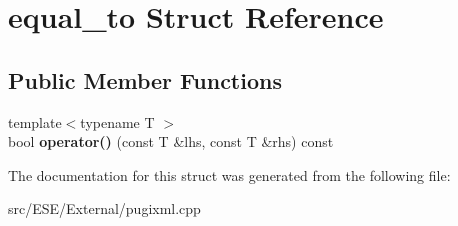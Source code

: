 \hypertarget{structequal__to}{\section{equal\-\_\-to Struct Reference}
\label{structequal__to}
}
\subsection*{Public Member Functions}
\begin{DoxyCompactItemize}
\item 
\hypertarget{structequal__to_acaf39da83a307280fef2f11691386b0e}{{\footnotesize template$<$typename T $>$ }\\bool {\bfseries operator()} (const T \&lhs, const T \&rhs) const }\label{structequal__to_acaf39da83a307280fef2f11691386b0e}

\end{DoxyCompactItemize}


The documentation for this struct was generated from the following file\-:\begin{DoxyCompactItemize}
\item 
src/\-E\-S\-E/\-External/pugixml.\-cpp\end{DoxyCompactItemize}
